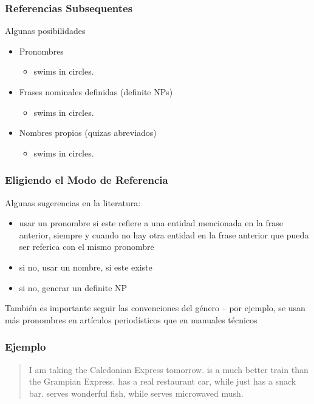 \documentclass[compress,color=usenames]{beamer}
\begin{document}
\begin{frame}
\frametitle{Referencias Subsequentes}

Algunas posibilidades

\begin{itemize}
\item {{Pronombres}}
\begin{itemize}
\item {} swims in circles.
\end{itemize}
\item Frases nominales definidas (definite NPs)
\begin{itemize}
\item {} swims in circles.
\end{itemize}
\item Nombres propios (quizas abreviados)
\begin{itemize}
\item {} swims in circles.
\end{itemize}
\end{itemize}
\end{frame}

\begin{frame}
\frametitle{Eligiendo el Modo de Referencia}

Algunas sugerencias en la literatura:
\begin{itemize}
\item usar un pronombre si este refiere a una entidad mencionada en la frase anterior, siempre y cuando no hay otra entidad en la frase anterior que pueda ser referica con el mismo pronombre
\item si no, usar un nombre, si este existe
\item si no, generar un definite NP
\end{itemize}

Tambi\'en es importante seguir las convenciones del g\'enero -- por ejemplo, se usan m\'as pronombres en art\'iculos period\'isticos que en manuales t\'ecnicos 
\end{frame}

\begin{frame}
\frametitle{Ejemplo}

\begin{quote}
 {{I am taking the Caledonian Express tomorrow.   is a much better train than the Grampian Express.   has a real restaurant car, while  just has a snack bar.    serves wonderful fish, while  serves microwaved mush.}}
\end{quote}
\end{frame}
\end{document}
